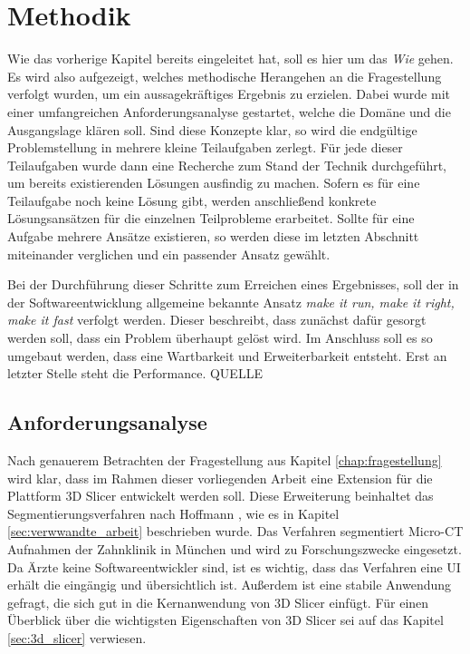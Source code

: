 \chapter{Methodik}
\label{chap:methodik} Wie das vorherige Kapitel bereits eingeleitet hat, soll es
hier um das \textit{Wie} gehen. Es wird also aufgezeigt, welches methodische Herangehen
an die Fragestellung verfolgt wurden, um ein aussagekräftiges Ergebnis zu
erzielen. Dabei wurde mit einer umfangreichen Anforderungsanalyse gestartet,
welche die Domäne und die Ausgangslage klären soll. Sind diese Konzepte klar, so
wird die endgültige Problemstellung in mehrere kleine Teilaufgaben zerlegt. Für jede
dieser Teilaufgaben wurde dann eine Recherche zum Stand der Technik durchgeführt,
um bereits existierenden Lösungen ausfindig zu machen. Sofern es für eine Teilaufgabe
noch keine Lösung gibt, werden anschließend konkrete Lösungsansätzen für die
einzelnen Teilprobleme erarbeitet. Sollte für eine Aufgabe mehrere Ansätze existieren,
so werden diese im letzten Abschnitt miteinander verglichen und ein passender
Ansatz gewählt.

Bei der Durchführung dieser Schritte zum Erreichen eines Ergebnisses, soll der in
der Softwareentwicklung allgemeine bekannte Ansatz \textit{make it run, make it right,
make it fast} verfolgt werden. Dieser beschreibt, dass zunächst dafür gesorgt
werden soll, dass ein Problem überhaupt gelöst wird. Im Anschluss soll es so
umgebaut werden, dass eine Wartbarkeit und Erweiterbarkeit entsteht. Erst an
letzter Stelle steht die Performance. QUELLE

\section{Anforderungsanalyse}
\label{sec:anforderungsanalyse} Nach genauerem Betrachten der Fragestellung aus
Kapitel \ref{chap:fragestellung} wird klar, dass im Rahmen dieser vorliegenden Arbeit
eine Extension für die Plattform 3D Slicer entwickelt werden soll. Diese
Erweiterung beinhaltet das Segmentierungsverfahren nach Hoffmann \citep[vgl.][]{hoffmann2020},
wie es in Kapitel \ref{sec:verwwandte_arbeit} beschrieben wurde. Das Verfahren segmentiert
Micro-CT Aufnahmen der Zahnklinik in München und wird zu Forschungszwecke eingesetzt.
Da Ärzte keine Softwareentwickler sind, ist es wichtig, dass das Verfahren eine
UI erhält die eingängig und übersichtlich ist. Außerdem ist eine stabile Anwendung
gefragt, die sich gut in die Kernanwendung von 3D Slicer einfügt. Für einen Überblick
über die wichtigsten Eigenschaften von 3D Slicer sei auf das Kapitel \ref{sec:3d_slicer}
verwiesen.

